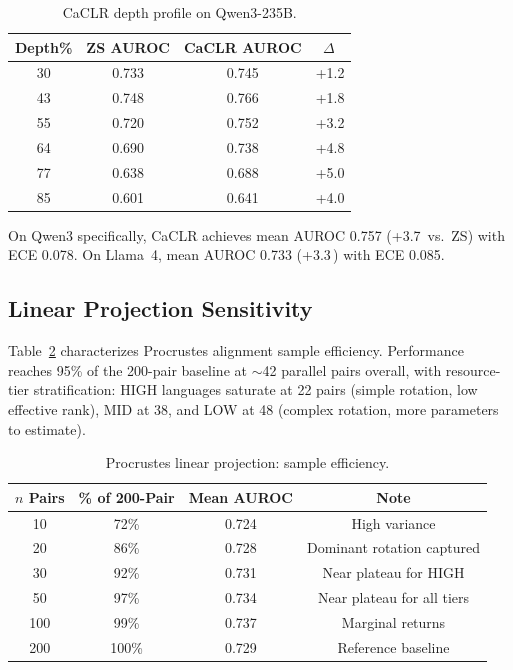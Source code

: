 \documentclass[11pt,a4paper]{article}
\newcommand{\pp}{\,\text{pp}}
\begin{document}
\begin{table}[t]
\centering
\caption{CaCLR depth profile on Qwen3-235B.}
\label{tab:caclr_depth}
\small
\begin{tabular}{cccc}
\toprule
Depth\% & ZS AUROC & CaCLR AUROC & $\Delta$\pp \\
\midrule
30 & 0.733 & 0.745 & +1.2 \\
43 & 0.748 & 0.766 & +1.8 \\
55 & 0.720 & 0.752 & +3.2 \\
64 & 0.690 & 0.738 & +4.8 \\
77 & 0.638 & 0.688 & +5.0 \\
85 & 0.601 & 0.641 & +4.0 \\
\bottomrule
\end{tabular}
\end{table}

On Qwen3 specifically, CaCLR achieves mean AUROC 0.757 (+3.7\pp{} vs.\ ZS) with ECE 0.078. On Llama~4, mean AUROC 0.733 (+3.3\pp) with ECE 0.085.

\subsection{Linear Projection Sensitivity}
\label{sec:linproj}

Table~\ref{tab:proj_efficiency} characterizes Procrustes alignment sample efficiency. Performance reaches 95\% of the 200-pair baseline at $\sim$42 parallel pairs overall, with resource-tier stratification: HIGH languages saturate at 22 pairs (simple rotation, low effective rank), MID at 38, and LOW at 48 (complex rotation, more parameters to estimate).

\begin{table}[t]
\centering
\caption{Procrustes linear projection: sample efficiency.}
\label{tab:proj_efficiency}
\small
\begin{tabular}{cccc}
\toprule
$n$ Pairs & \% of 200-Pair & Mean AUROC & Note \\
\midrule
10  & 72\% & 0.724 & High variance \\
20  & 86\% & 0.728 & Dominant rotation captured \\
30  & 92\% & 0.731 & Near plateau for HIGH \\
50  & 97\% & 0.734 & Near plateau for all tiers \\
100 & 99\% & 0.737 & Marginal returns \\
200 & 100\% & 0.729 & Reference baseline \\
\bottomrule
\end{tabular}
\end{table}
\end{document}
